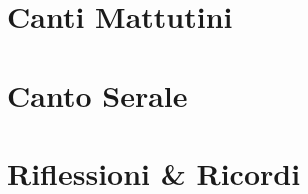

\morningPartSettings

\part{Canti Mattutini}

\morningChapterSettings



\morningSettingsRestore

\eveningPartSettings

\part{Canto Serale}

\eveningChapterSettings



\eveningSettingsRestore


\part{Riflessioni \& Ricordi}



% 
% 





% 


